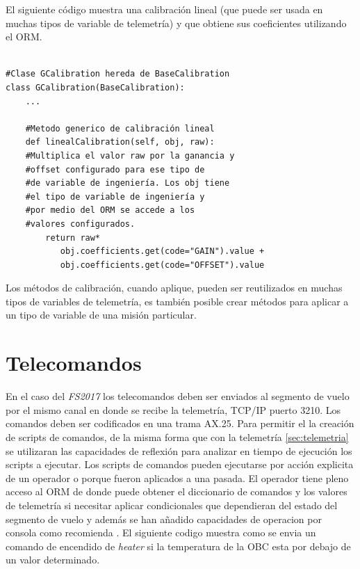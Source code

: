 \documentclass[twoside,twocolumn]{article}
\begin{document}
{{El siguiente código muestra una calibración lineal (que puede ser usada en muchas tipos de variable de telemetría) y que obtiene sus coeficientes utilizando el ORM.

\begin{verbatim}

#Clase GCalibration hereda de BaseCalibration
class GCalibration(BaseCalibration):
    ...
  
    #Metodo generico de calibración lineal
    def linealCalibration(self, obj, raw):
	#Multiplica el valor raw por la ganancia y 
	#offset configurado para ese tipo de
	#de variable de ingeniería. Los obj tiene 
	#el tipo de variable de ingeniería y
	#por medio del ORM se accede a los 
	#valores configurados.
        return raw*
	       obj.coefficients.get(code="GAIN").value + 
	       obj.coefficients.get(code="OFFSET").value

\end{verbatim}

Los métodos de calibración, cuando aplique, pueden ser reutilizados en muchas tipos de variables de telemetría, es también posible crear métodos para aplicar a un tipo de variable de una misión particular.



\section{Telecomandos}
En el caso del \textit{FS2017} los telecomandos deben ser enviados al segmento de vuelo por el mismo canal en donde se recibe la telemetría, TCP/IP puerto 3210. Los comandos deben ser codificados en una trama AX.25. 
Para permitir el la creación de scripts de comandos, de la misma forma que con la telemetría \ref{sec:telemetria} se utilizaran las capacidades de reflexión para analizar en tiempo de ejecución los scripts a ejecutar. Los scripts de comandos pueden ejecutarse por acción explicita de un operador o porque fueron aplicados a una pasada. 
El operador tiene pleno acceso al ORM de donde puede obtener el diccionario de comandos y los valores de telemetría si necesitar aplicar condicionales que dependieran del estado del segmento de vuelo y además se han añadido capacidades de operacion por consola como recomienda \cite{galal2001satellite}. El siguiente codigo muestra como se envia un comando de encendido de \textit{heater} si la temperatura de la OBC esta por debajo de un valor determinado.

\begin{verbatim}


\end{verbatim}}}
\end{document}
